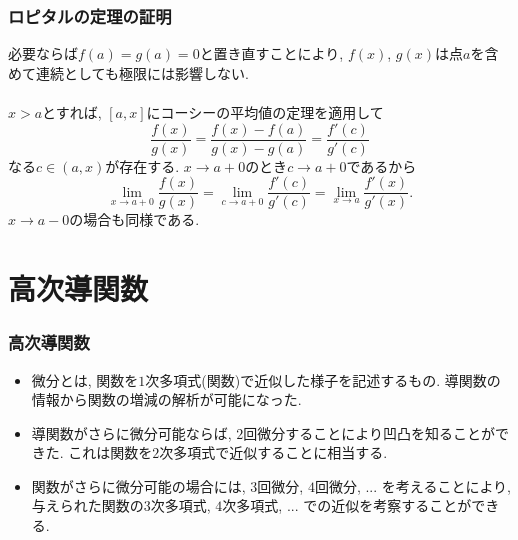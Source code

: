 \documentclass[dvipdfmx,cjk,10.2pt]{beamer}
\theoremstyle{definition}
\begin{document}
\begin{frame}
\frametitle{ロピタルの定理の証明}
必要ならば$f(a)=g(a)=0$と置き直すことにより, $f(x)$, $g(x)$は点$a$を含めて連続としても極限には影響しない. \\
\ \\

$x>a$とすれば, $[a, x]$にコーシーの平均値の定理を適用して
$$
\frac{f(x)}{g(x)}=
\frac{f(x)-f(a)}{g(x)-g(a)}=
\frac{f'(c)}{g'(c)}
$$
なる$c \in (a,x)$が存在する. 
$x \to a+0$のとき$c \to a +0$であるから
$$
\lim_{x\to a+0}\frac{f(x)}{g(x)}  = \lim_{c \to a+0}\frac{f'(c)}{g'(c)}= \lim_{x\to a}\frac{f'(x)}{g'(x)}. 
$$
$x \to a-0$の場合も同様である. 

\end{frame}







\section{高次導関数}


\begin{frame}
\frametitle{高次導関数}


\begin{itemize}
\item 微分とは, 関数を$1$次多項式(関数)で近似した様子を記述するもの. 
導関数の情報から関数の増減の解析が可能になった. 
\item 導関数がさらに微分可能ならば, $2$回微分することにより凹凸を知ることができた. 
これは関数を$2$次多項式で近似することに相当する.
\item 関数がさらに微分可能の場合には, $3$回微分, $4$回微分, ... を考えることにより, 
与えられた関数の$3$次多項式, $4$次多項式, ... での近似を考察することができる. 
\end{itemize}


\end{frame}



\end{document}
